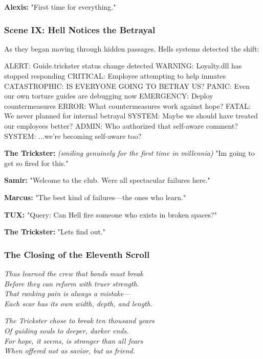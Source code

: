 \textbf{Alexis:} "First time for everything."

\bookdivider

\subsubsection{Scene IX: Hell Notices the Betrayal}\label{scene-ix-hell-notices-the-betrayal}

As they began moving through hidden passages, Hell\textquotesingle s systems detected the shift:

\begin{codeblock}
ALERT: Guide.trickster status change detected
WARNING: Loyalty.dll has stopped responding
CRITICAL: Employee attempting to help inmates
CATASTROPHIC: IS EVERYONE GOING TO BETRAY US?
PANIC: Even our own torture guides are debugging now
EMERGENCY: Deploy countermeasures
ERROR: What countermeasures work against hope?
FATAL: We never planned for internal betrayal
SYSTEM: Maybe we should have treated our employees better?
ADMIN: Who authorized that self-aware comment?
SYSTEM: ...we're becoming self-aware too?
\end{codeblock}

\textbf{The Trickster:} \emph{(smiling genuinely for the first time in millennia)} "I\textquotesingle m going to get so fired for this."

\textbf{Samir:} "Welcome to the club. We\textquotesingle re all spectacular failures here."

\textbf{Marcus:} "The best kind of failures---the ones who learn."

\textbf{TUX:} "Query: Can Hell fire someone who exists in broken spaces?"

\textbf{The Trickster:} "Let\textquotesingle s find out."

\bookdivider

\subsubsection{The Closing of the Eleventh Scroll}\label{the-closing-of-the-eleventh-scroll}

\emph{Thus learned the crew that bonds must break}\\
\emph{Before they can reform with truer strength.}\\
\emph{That ranking pain is always a mistake---}\\
\emph{Each scar has its own width, depth, and length.}

\emph{The Trickster chose to break ten thousand years}\\
\emph{Of guiding souls to deeper, darker ends.}\\
\emph{For hope, it seems, is stronger than all fears}\\
\emph{When offered not as savior, but as friend.}

